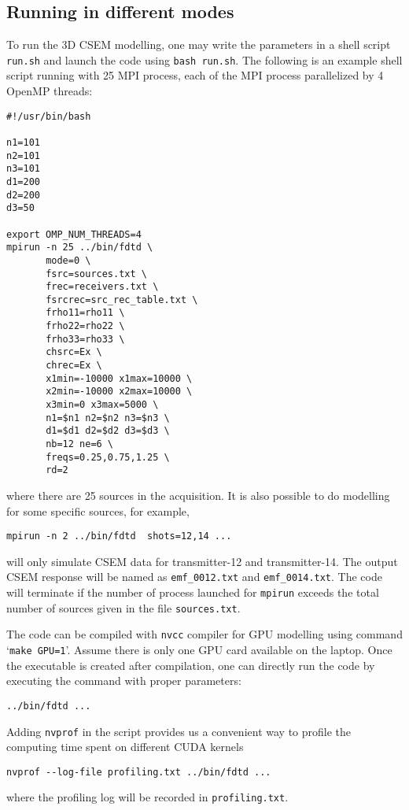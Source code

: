\documentclass[a4paper,10pt]{article}
\begin{document}
\subsection{Running in different modes}

To run the 3D CSEM modelling, one may write the parameters in a shell script \verb|run.sh| and launch the code using \verb|bash run.sh|. The following is an example shell script running with 25 MPI process, each of the MPI process parallelized by 4 OpenMP threads:
\begin{verbatim}
#!/usr/bin/bash

n1=101
n2=101
n3=101
d1=200
d2=200
d3=50 

export OMP_NUM_THREADS=4
mpirun -n 25 ../bin/fdtd \
       mode=0 \
       fsrc=sources.txt \
       frec=receivers.txt \
       fsrcrec=src_rec_table.txt \
       frho11=rho11 \
       frho22=rho22 \
       frho33=rho33 \
       chsrc=Ex \
       chrec=Ex \
       x1min=-10000 x1max=10000 \
       x2min=-10000 x2max=10000 \
       x3min=0 x3max=5000 \
       n1=$n1 n2=$n2 n3=$n3 \
       d1=$d1 d2=$d2 d3=$d3 \
       nb=12 ne=6 \
       freqs=0.25,0.75,1.25 \
       rd=2 
\end{verbatim}
where there are 25 sources in the acquisition. It is also possible to do modelling for some specific sources, for example, 
\begin{verbatim}
mpirun -n 2 ../bin/fdtd  shots=12,14 ...
\end{verbatim}
will only simulate CSEM data for transmitter-12 and transmitter-14. The output CSEM response will be named as \verb|emf_0012.txt| and \verb|emf_0014.txt|. The code will terminate if the number of process launched for \verb|mpirun| exceeds the total number of sources given in the file \verb|sources.txt|.

The code can be compiled with \verb|nvcc| compiler for GPU modelling using command `\verb|make GPU=1|'. 
Assume there is only one GPU card available on the laptop. Once the executable is created after compilation, one can directly run the code by executing the command with proper parameters:
\begin{verbatim}
../bin/fdtd ...
\end{verbatim}
Adding \verb|nvprof| in the script provides us a convenient way to profile the computing time spent on different CUDA kernels
\begin{verbatim}
nvprof --log-file profiling.txt ../bin/fdtd ...
\end{verbatim}
where the profiling log will be recorded in \verb|profiling.txt|. 
\end{document}
